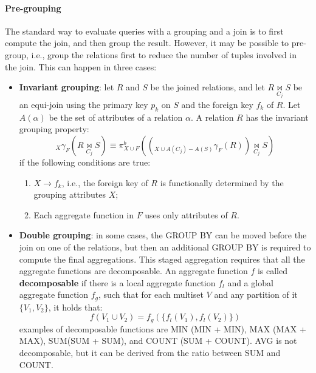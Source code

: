 \paragraph{Pre-grouping} The standard way to evaluate queries with a grouping and a join is to first compute the join, and then group the result. However, it may be possible to pre-group, i.e., group the relations first to reduce the number of tuples involved in the join. This can happen in three cases:
\begin{itemize}
    \item \textbf{Invariant grouping}: let $R$ and $S$ be the joined relations, and let $R \underset{C_j}{\bowtie} S$ be an equi-join using the primary key $p_k$ on $S$ and the foreign key $f_k$ of $R$. Let $A(\alpha)$ be the set of attributes of a relation $\alpha$. A relation $R$ has the invariant grouping property:
    \begin{equation*}
        _X \gamma_F(R \underset{C_j}{\bowtie} S) \equiv \pi^b_{X \cup F} ((_{X \cup A(C_j) - A(S)} \gamma_F (R)) \underset{C_j}{\bowtie} S)
    \end{equation*}
    if the following conditions are true:
    \begin{enumerate}[noitemsep]
        \item $X \rightarrow f_k$, i.e., the foreign key of $R$ is functionally determined by the grouping attributes $X$;
        \item Each aggregate function in $F$ uses only attributes of $R$.
    \end{enumerate}
    \item \textbf{Double grouping}: in some cases, the GROUP BY can be moved before the join on one of the relations, but then an additional GROUP BY is required to compute the final aggregations. This staged aggregation requires that all the aggregate functions are decomposable. An aggregate function $f$ is called \textbf{decomposable} if there is a local aggregate function $f_l$ and a global aggregate function $f_g$, such that for each multiset $V$ and any partition of it $\{V_1, V_2\}$, it holds that:
    \begin{equation*}
        f(V_1 \cup V_2) = f_g(\{f_l(V_1), f_l(V_2)\})
    \end{equation*}
    examples of decomposable functions are MIN (MIN + MIN), MAX (MAX + MAX), SUM(SUM + SUM), and COUNT (SUM + COUNT). AVG is not decomposable, but it can be derived from the ratio between SUM and COUNT.


\end{itemize}
